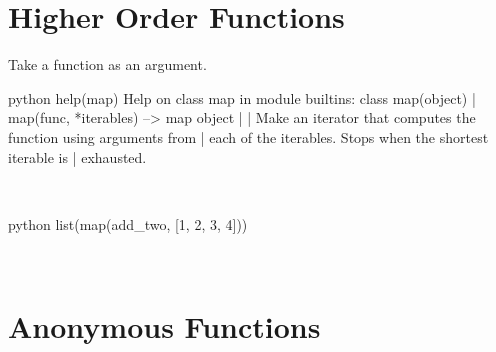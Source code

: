 \documentclass[aspectratio=1610,slidestop]{beamer}
\newcommand{\decl}[1]{\textcolor{blue}{\lstinline{#1}}}
\begin{document}
\section{Higher Order Functions}
\begin{pframe}
 Take a function as an argument.
 \begin{ipython}
  \begin{pythonin}{python}
help(map)
Help on class map in module builtins:
class map(object)
 |  map(func, *iterables) --> map object
 |
 |  Make an iterator that computes the function using arguments from
 |  each of the iterables.  Stops when the shortest iterable is
 |  exhausted.
  \end{pythonin}
  \\

 \begin{pythonin}{python}
list(map(add_two, [1, 2, 3, 4]))
  \end{pythonin}
  \\
  \begin{pythonout}
[3, 4, 5, 6]
  \end{pythonout}
 \end{ipython}
\end{pframe}



\section{Anonymous Functions}

%
%
\end{document}

